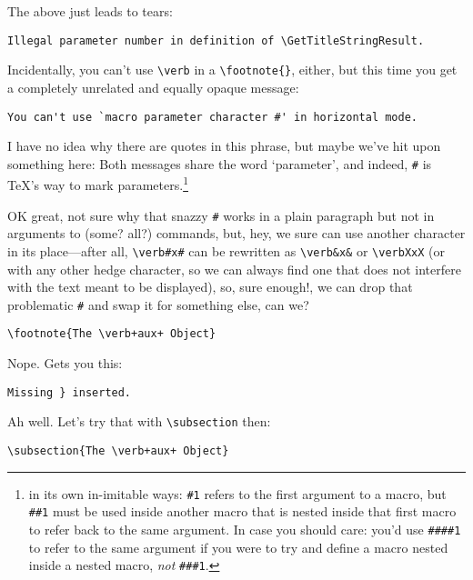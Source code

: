 The above just leads to tears:

\begin{verbatim}
Illegal parameter number in definition of \GetTitleStringResult.
\end{verbatim}

Incidentally, you can't use \verb#\verb# in a \verb#\footnote{}#, either, but this time you get
a completely unrelated and equally opaque message:

\begin{verbatim}
You can't use `macro parameter character #' in horizontal mode.
\end{verbatim}

I have no idea why there are quotes in this phrase, but maybe we've hit upon something here: Both messages
share the word `parameter', and indeed, \verb°#° is \TeX's way to mark parameters.\footnote{in its own
in-imitable ways: \texttt{\#1} refers to the first argument to a macro, but \texttt{\#\#1} must be used
inside another macro that is nested inside that first macro to refer back to the same argument. In case
you should care: you'd use \texttt{\#\#\#\#1} to refer to the same argument if you were to try
and define a macro nested inside a nested macro, {\em not} \texttt{\#\#\#1}.}

OK great, not sure why that snazzy \verb°#° works in a plain paragraph but not in arguments to (some? all?)
commands, but, hey, we sure can use another character in its place---after all, \verb§\verb#x#§ can be
rewritten as \verb§\verb&x&§ or \verb§\verbXxX§ (or with any other hedge character, so we can always find
one that does not interfere with the text meant to be displayed), so, sure enough!, we can drop that
problematic \verb°#° and swap it for something else, can we?

\begin{verbatim}
\footnote{The \verb+aux+ Object}
\end{verbatim}

Nope. Gets you this:

\begin{verbatim}
Missing } inserted.
\end{verbatim}

Ah well. Let's try that with \verb#\subsection# then:

\begin{verbatim}
\subsection{The \verb+aux+ Object}
\end{verbatim}

